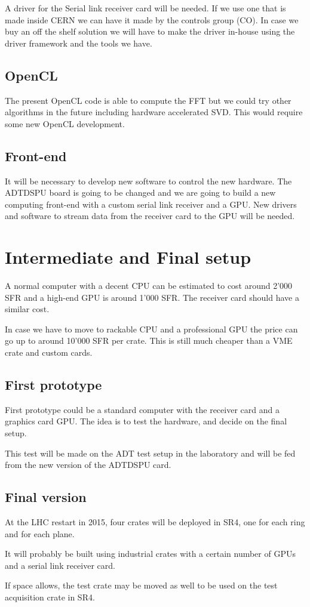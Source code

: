 A driver for the Serial link receiver card will be needed. If we use one that is made inside \gls{CERN} we can have it made by the controls group (CO). In case we buy an off the shelf solution we will have to make the driver in-house using the driver framework and the tools we have.

\subsection{OpenCL}

The present \gls{OpenCL} code is able to compute the \gls{FFT} but we could try other algorithms in the future including hardware accelerated \gls{SVD}. This would require some new \gls{OpenCL} development.

\subsection{Front-end}

It will be necessary to develop new software to control the new hardware. The \gls{ADTDSPU} board is going to be changed and we are going to build a new computing front-end with a custom serial link receiver and a \gls{GPU}. New drivers and software to stream data from the receiver card to the \gls{GPU} will be needed.

\section{Intermediate and Final setup}

A normal computer with a decent \gls{CPU} can be estimated to cost around 2'000 SFR and a high-end \gls{GPU} is around 1'000 SFR. The receiver card should have a similar cost.

In case we have to move to rackable \gls{CPU} and a professional \gls{GPU} the price can go up to around 10'000 SFR per crate. This is still much cheaper than a \gls{VME} crate and custom cards.

\subsection{First prototype}

First prototype could be a standard computer with the receiver card and a graphics card \gls{GPU}. The idea is to test the hardware, and decide on the final setup.

This test will be made on the \gls{ADT} test setup in the laboratory and will be fed from the new version of the \gls{ADTDSPU} card.

\subsection{Final version}

At the \gls{LHC} restart in 2015, four crates will be deployed in \gls{SR4}, one for each ring and for each plane.

It will probably be built using industrial crates with a certain number of \glspl{GPU} and a serial link receiver card. 

If space allows, the test crate may be moved as well to be used on the test acquisition crate in \gls{SR4}.
